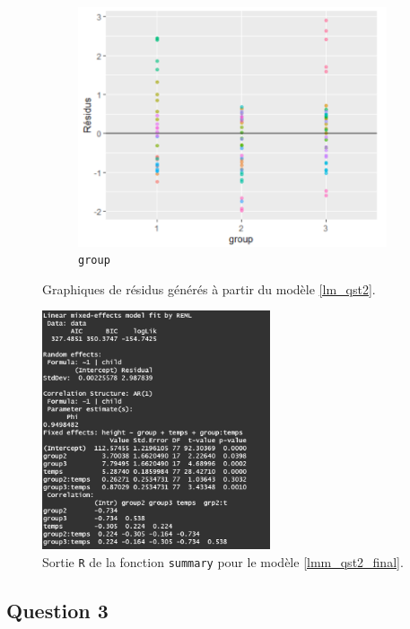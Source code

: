 \documentclass{article}
\begin{document}
\begin{figure}[H]
\begin{subfigure}{0.48\textwidth}
		\includegraphics[width=1\textwidth]{graphiques/Residus_VS_group_qst2}
		\caption{\texttt{group}}
		\label{Residus_VS_group_qst2}
	\end{subfigure}
	\caption{Graphiques de résidus générés à partir du modèle \eqref{lm_qst2}.}
	\label{residus_qst2}
\end{figure}

\begin{figure}[H]  %
	\centering
	\includegraphics[width=0.6\textwidth]{graphiques/summary_Qst2}
	\caption{Sortie \texttt{R} de la fonction \texttt{summary} pour le modèle \eqref{lmm_qst2_final}.}
	\label{summary_Qst2}
\end{figure}


\subsection{Question 3}

	
\end{document}
